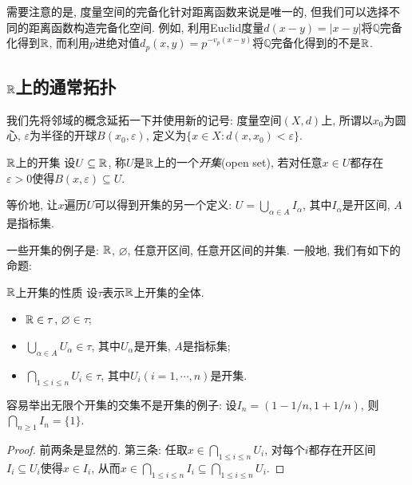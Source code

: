 需要注意的是, 度量空间的完备化针对距离函数来说是唯一的, 但我们可以选择不同的距离函数构造完备化空间. 例如, 利用Euclid度量$d(x-y)=|x-y|$将$\mathbb{Q}$完备化得到$\mathbb{R}$, 而利用$p$进绝对值$d_p(x,y) = p^{-v_p(x-y)}$将$\mathbb{Q}$完备化得到的不是$\mathbb{R}$. 


\subsection{$\mathbb{R}$上的通常拓扑}

我们先将邻域的概念延拓一下并使用新的记号: 度量空间$(X,d)$上, 所谓以$x_0$为圆心, $\varepsilon$为半径的开球$B(x_0,\varepsilon)$, 定义为$\{ x \in X:d(x,x_0)<\varepsilon \}$. 

\begin{definition}{$\mathbb{R}$上的开集}
	设$U \subseteq \mathbb{R}$, 称$U$是$\mathbb{R}$上的一个\textit{开集}(open set), 若对任意$x \in U$都存在$\varepsilon >0$使得$B(x,\varepsilon) \subseteq U$. 
\end{definition}
\begin{remark}
	等价地, 让$x$遍历$U$可以得到开集的另一个定义: $U=\bigcup_{\alpha \in A} I_{\alpha}$, 其中$I_{\alpha}$是开区间, $A$是指标集. 
\end{remark}

一些开集的例子是: $\mathbb{R}$, $\varnothing$, 任意开区间, 任意开区间的并集. 一般地, 我们有如下的命题: 

\begin{proposition}{$\mathbb{R}$上开集的性质}
	设$\tau$表示$\mathbb{R}$上开集的全体. 
	\begin{itemize}
		\item $\mathbb{R} \in \tau$, $\varnothing \in \tau$; 
		\item $\bigcup_{\alpha \in A} U_{\alpha} \in \tau$, 其中$U_{\alpha}$是开集, $A$是指标集; 
		\item $\bigcap_{1 \leq i \leq n} U_i \in \tau$, 其中$U_i(i=1,\cdots ,n)$是开集. 
	\end{itemize}
\end{proposition}
\begin{remark}
	容易举出无限个开集的交集不是开集的例子: 设$I_n=(1-1/n,1+1/n)$, 则$\bigcap_{n\geq 1}I_n = \{ 1 \}$. 
\end{remark}
\begin{proof}
	前两条是显然的. 第三条: 任取$x \in \bigcap_{1 \leq i \leq n} U_i$, 对每个$i$都存在开区间$I_i \subseteq U_i$使得$x \in I_i$, 从而$x \in \bigcap_{1 \leq i \leq n} I_i \subseteq \bigcap_{1 \leq i \leq n} U_i$. 
\end{proof}

